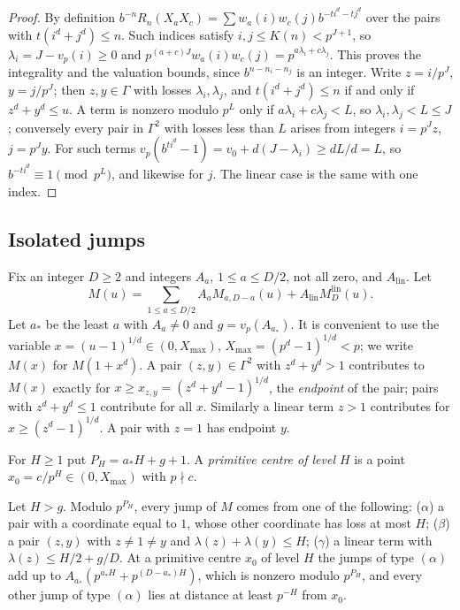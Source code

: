 \documentclass[11pt]{article}
\begin{document}
\begin{proof}
By definition $b^{-n}R_n(X_aX_c)=\sum w_a(i)w_c(j)b^{-ti^d-tj^d}$ over the pairs with $t(i^d+j^d)\le n$.
Such indices satisfy $i,j\le K(n)<p^{J+1}$, so $\lambda_i=J-v_p(i)\ge0$ and
$p^{(a+c)J}w_a(i)w_c(j)=p^{a\lambda_i+c\lambda_j}$. This proves the integrality and the valuation bounds,
since $b^{n-n_i-n_j}$ is an integer. Write $z=i/p^J$, $y=j/p^J$; then $z,y\in\Gamma$ with losses
$\lambda_i,\lambda_j$, and $t(i^d+j^d)\le n$ if and only if $z^d+y^d\le u$. A term is nonzero modulo $p^L$
only if $a\lambda_i+c\lambda_j<L$, so $\lambda_i,\lambda_j<L\le J$; conversely every pair in $\Gamma^2$ with
losses less than $L$ arises from integers $i=p^Jz$, $j=p^Jy$. For such terms
$v_p(b^{ti^d}-1)=v_0+d(J-\lambda_i)\ge dL/d=L$, so $b^{-ti^d}\equiv1\pmod{p^L}$, and likewise for $j$.
The linear case is the same with one index.
\end{proof}

\subsection{Isolated jumps}\label{sec:quad-iso}

Fix an integer $D\ge2$ and integers $A_a$, $1\le a\le D/2$, not all zero, and $A_{\mathrm{lin}}$. Let
\[
M(u)=\sum_{1\le a\le D/2}A_aM_{a,D-a}(u)+A_{\mathrm{lin}}M^{\mathrm{lin}}_D(u).
\]
Let $a_*$ be the least $a$ with $A_a\ne0$ and $g=v_p(A_{a_*})$. It is convenient to use the variable
$x=(u-1)^{1/d}\in(0,X_{\max})$, $X_{\max}=(p^d-1)^{1/d}<p$; we write $M(x)$ for $M(1+x^d)$. A pair
$(z,y)\in\Gamma^2$ with $z^d+y^d>1$ contributes to $M(x)$ exactly for $x\ge x_{z,y}=(z^d+y^d-1)^{1/d}$, the
\emph{endpoint} of the pair; pairs with $z^d+y^d\le1$ contribute for all $x$. Similarly a linear term
$z>1$ contributes for $x\ge(z^d-1)^{1/d}$. A pair with $z=1$ has endpoint $y$.

For $H\ge1$ put $P_H=a_*H+g+1$. A \emph{primitive centre of level $H$} is a point $x_0=c/p^H\in(0,X_{\max})$
with $p\nmid c$.

\begin{lemma}\label{lem:primjump}
Let $H>g$. Modulo $p^{P_H}$, every jump of $M$ comes from one of the following: \textup{($\alpha$)} a pair
with a coordinate equal to $1$, whose other coordinate has loss at most $H$; \textup{($\beta$)} a pair
$(z,y)$ with $z\ne1\ne y$ and $\lambda(z)+\lambda(y)\le H$; \textup{($\gamma$)} a linear term with
$\lambda(z)\le H/2+g/D$. At a primitive centre $x_0$ of level $H$ the jumps of type $(\alpha)$ add up to
$A_{a_*}(p^{a_*H}+p^{(D-a_*)H})$, which is nonzero modulo $p^{P_H}$, and every other jump of type
$(\alpha)$ lies at distance at least $p^{-H}$ from $x_0$.
\end{lemma}
\end{document}
